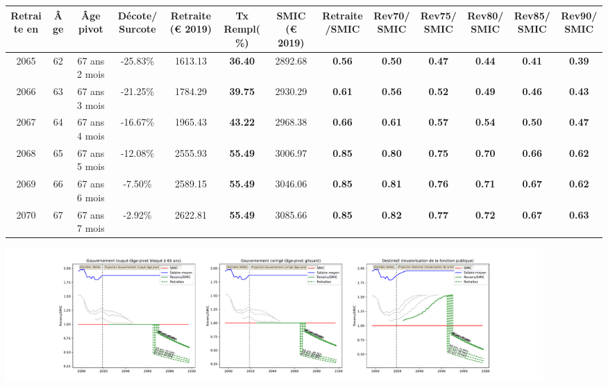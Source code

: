 { \scriptsize \begin{center} 
\begin{tabular}[htb]{|c|c||c|c||c|c||c||c|c|c|c|c|c|} 
\hline 
 Retraite en &  Âge &  Âge pivot &  Décote/Surcote &  Retraite (\euro{} 2019) &  Tx Rempl(\%) &  SMIC (\euro{} 2019) &  Retraite/SMIC &  Rev70/SMIC &  Rev75/SMIC &  Rev80/SMIC &  Rev85/SMIC &  Rev90/SMIC \\ 
\hline \hline 
 2065 &  62 &  67 ans 2 mois &  -25.83\% &  1613.13 &  {\bf 36.40} &  2892.68 &  {\bf {\color{red} 0.56}} &  {\bf {\color{red} 0.50}} &  {\bf {\color{red} 0.47}} &  {\bf {\color{red} 0.44}} &  {\bf {\color{red} 0.41}} &  {\bf {\color{red} 0.39}} \\ 
\hline 
 2066 &  63 &  67 ans 3 mois &  -21.25\% &  1784.29 &  {\bf 39.75} &  2930.29 &  {\bf {\color{red} 0.61}} &  {\bf {\color{red} 0.56}} &  {\bf {\color{red} 0.52}} &  {\bf {\color{red} 0.49}} &  {\bf {\color{red} 0.46}} &  {\bf {\color{red} 0.43}} \\ 
\hline 
 2067 &  64 &  67 ans 4 mois &  -16.67\% &  1965.43 &  {\bf 43.22} &  2968.38 &  {\bf {\color{red} 0.66}} &  {\bf {\color{red} 0.61}} &  {\bf {\color{red} 0.57}} &  {\bf {\color{red} 0.54}} &  {\bf {\color{red} 0.50}} &  {\bf {\color{red} 0.47}} \\ 
\hline 
 2068 &  65 &  67 ans 5 mois &  -12.08\% &  2555.93 &  {\bf 55.49} &  3006.97 &  {\bf {\color{red} 0.85}} &  {\bf {\color{red} 0.80}} &  {\bf {\color{red} 0.75}} &  {\bf {\color{red} 0.70}} &  {\bf {\color{red} 0.66}} &  {\bf {\color{red} 0.62}} \\ 
\hline 
 2069 &  66 &  67 ans 6 mois &  -7.50\% &  2589.15 &  {\bf 55.49} &  3046.06 &  {\bf {\color{red} 0.85}} &  {\bf {\color{red} 0.81}} &  {\bf {\color{red} 0.76}} &  {\bf {\color{red} 0.71}} &  {\bf {\color{red} 0.67}} &  {\bf {\color{red} 0.62}} \\ 
\hline 
 2070 &  67 &  67 ans 7 mois &  -2.92\% &  2622.81 &  {\bf 55.49} &  3085.66 &  {\bf {\color{red} 0.85}} &  {\bf {\color{red} 0.82}} &  {\bf {\color{red} 0.77}} &  {\bf {\color{red} 0.72}} &  {\bf {\color{red} 0.67}} &  {\bf {\color{red} 0.63}} \\ 
\hline 
\hline 
\end{tabular} 
\end{center} } 

 \begin{center}\includegraphics[width=0.9\textwidth]{fig/AideSoignant_2003_22_dest_retraite.pdf}\end{center} \label{fig/AideSoignant_2003_22_dest_retraite.pdf} 

